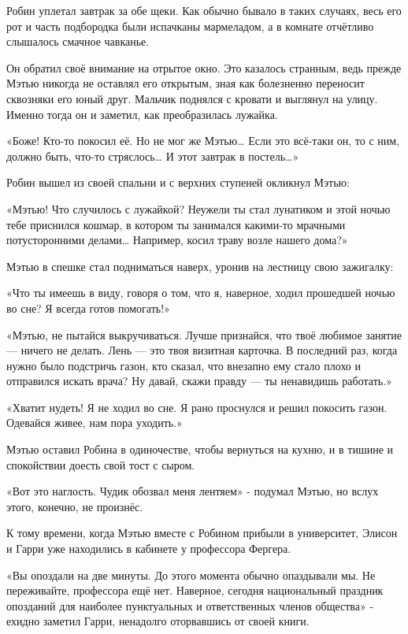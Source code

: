 \documentclass[a4paper,12pt]{book}
\begin{document}
\par
Робин уплетал завтрак за обе щеки. Как обычно бывало в таких случаях, весь его рот и часть подбородка были испачканы мармеладом, а в комнате отчётливо слышалось смачное чавканье.
\par
Он обратил своё внимание на отрытое окно. Это казалось странным, ведь прежде Мэтью никогда не оставлял его открытым, зная как болезненно переносит сквозняки его юный друг. Мальчик поднялся с кровати и выглянул на улицу. Именно тогда он и заметил, как преобразилась лужайка.
\par
«Боже! Кто-то покосил её. Но не мог же Мэтью… Если это всё-таки он, то с ним, должно быть, что-то стряслось… И этот завтрак в постель…»
\par
Робин вышел из своей спальни и с верхних ступеней окликнул Мэтью:
\par
«Мэтью! Что случилось с лужайкой? Неужели ты стал лунатиком и этой ночью тебе приснился кошмар, в котором ты занимался какими-то мрачными потусторонними делами… Например, косил траву возле нашего дома?»
\par
Мэтью в спешке стал подниматься наверх, уронив на лестницу свою зажигалку:
\par
«Что ты имеешь в виду, говоря о том, что я, наверное, ходил прошедшей ночью во сне? Я всегда готов помогать!»
\par
«Мэтью, не пытайся выкручиваться. Лучше признайся, что твоё любимое занятие — ничего не делать. Лень — это твоя визитная карточка. В последний раз, когда нужно было подстричь газон, кто сказал, что внезапно ему стало плохо и отправился искать врача? Ну давай, скажи правду — ты ненавидишь работать.»
\par
«Хватит нудеть! Я не ходил во сне. Я рано проснулся и решил покосить газон. Одевайся живее, нам пора уходить.»
\par
Мэтью оставил Робина в одиночестве, чтобы вернуться на кухню, и в тишине и спокойствии доесть свой тост с сыром.
\par
«Вот это наглость. Чудик обозвал меня лентяем» - подумал Мэтью, но вслух этого, конечно, не произнёс.\\
\par
К тому времени, когда Мэтью вместе с Робином прибыли в университет, Элисон и Гарри уже находились в кабинете у профессора Фергера.
\par
«Вы опоздали на две минуты. До этого момента обычно опаздывали мы. Не переживайте, профессора ещё нет. Наверное, сегодня национальный праздник опозданий для наиболее пунктуальных и ответственных членов общества» - ехидно заметил Гарри, ненадолго оторвавшись от своей книги.
\end{document}
